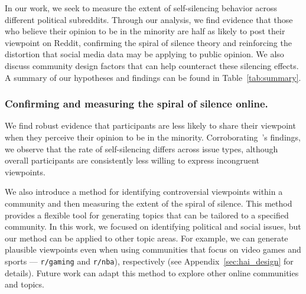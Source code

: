 In our work, we seek to measure the extent of self-silencing behavior across different political subreddits. Through our analysis, we find evidence that those who believe their opinion to be in the minority are half as likely to post their viewpoint on Reddit, confirming the spiral of silence theory and reinforcing the distortion that social media data may be applying to public opinion. We also discuss community design factors that can help counteract these silencing effects. 
A summary of our hypotheses and findings can be found in Table~\ref{tab:summary}. 

\subsubsection{Confirming and measuring the spiral of silence online.} 
We find robust evidence that participants are less likely to share their viewpoint when they perceive their opinion to be in the minority. Corroborating~\citet{gearhart2018same}'s findings, we observe that the rate of self-silencing differs across issue types, although overall participants are consistently less willing to express incongruent viewpoints. 

We also introduce a method for identifying controversial viewpoints within a community and then measuring the extent of the spiral of silence. This method provides a flexible tool for generating topics that can be tailored to a specified community. In this work, we focused on identifying political and social issues, but our method can be applied to other topic areas. For example, we can generate plausible viewpoints even when using communities that focus on video games and sports --- \texttt{r/gaming} and \texttt{r/nba}), respectively (see Appendix~\ref{sec:hai_design} for details). Future work can adapt this method to explore other online communities and topics. 



